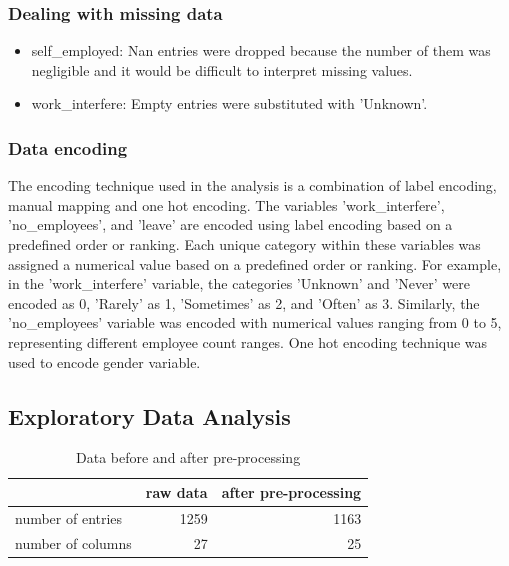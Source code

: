 \documentclass[conference]{IEEEtran}
\begin{document}
\subsubsection{Dealing with missing data}
\begin{itemize}
    \item self\_employed: Nan entries were dropped because the number of them was negligible and it would be difficult to interpret missing values.
    \item work\_interfere: Empty entries were substituted with 'Unknown'.
\end{itemize}

\subsubsection{Data encoding}
The encoding technique used in the analysis is a combination of label encoding, manual mapping and one hot encoding.
The variables 'work\_interfere', 'no\_employees', and 'leave' are encoded using label encoding based on a predefined order or ranking. Each unique category within these variables was assigned a numerical value based on a predefined order or ranking. For example, in the 'work\_interfere' variable, the categories 'Unknown' and 'Never' were encoded as 0, 'Rarely' as 1, 'Sometimes' as 2, and 'Often' as 3. Similarly, the 'no\_employees' variable was encoded with numerical values ranging from 0 to 5, representing different employee count ranges.
One hot encoding technique was used to encode gender variable.

\onecolumn
\subsection{Exploratory Data Analysis}

\begin{table}[h]
\centering
\begin{tabular}{|l|r|r|}
\hline
                  & raw data & after pre-processing \\ \hline
number of entries & 1259     & 1163                 \\ \hline
number of columns & 27       & 25                   \\ \hline
\end{tabular}
\caption{Data before and after pre-processing}
\label{tab:raw-normalized}
\end{table}
\end{document}
